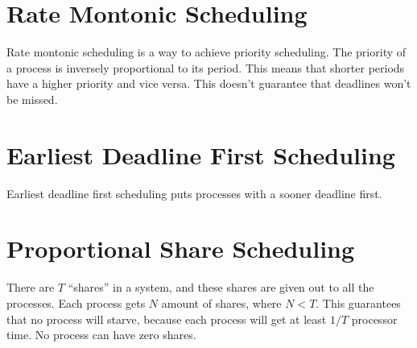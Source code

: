 \documentclass{article}
\begin{document}
\section{Rate Montonic Scheduling}
Rate montonic scheduling is a way to achieve priority scheduling. The priority
of a process is inversely proportional to its period. This means that shorter
periods have a higher priority and vice versa. This doesn't guarantee that
deadlines won't be missed.

\section{Earliest Deadline First Scheduling}
Earliest deadline first scheduling puts processes with a sooner deadline first.

\section{Proportional Share Scheduling}
There are $T$ ``shares'' in a system, and these shares are given out to all the
processes. Each process gets $N$ amount of shares, where $N<T$. This guarantees
that no process will starve, because each process will get at least $1/T$
processor time. No process can have zero shares.
\end{document}
